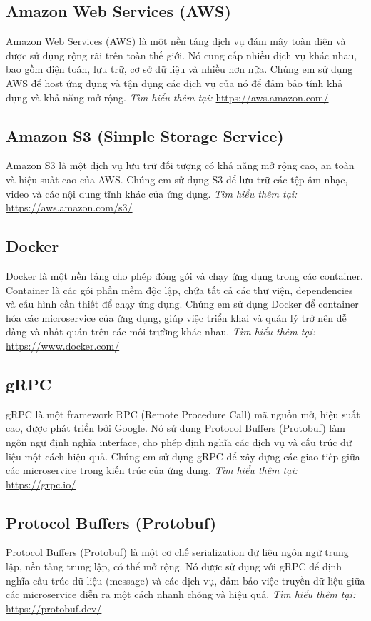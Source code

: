 \subsection{Amazon Web Services (AWS)}
Amazon Web Services (AWS) là một nền tảng dịch vụ đám mây toàn diện và được sử dụng rộng rãi trên toàn thế giới. Nó cung cấp nhiều dịch vụ khác nhau, bao gồm điện toán, lưu trữ, cơ sở dữ liệu và nhiều hơn nữa. Chúng em sử dụng AWS để host ứng dụng và tận dụng các dịch vụ của nó để đảm bảo tính khả dụng và khả năng mở rộng.
\textit{Tìm hiểu thêm tại:} \url{https://aws.amazon.com/}

\subsection{Amazon S3 (Simple Storage Service)}
Amazon S3 là một dịch vụ lưu trữ đối tượng có khả năng mở rộng cao, an toàn và hiệu suất cao của AWS. Chúng em sử dụng S3 để lưu trữ các tệp âm nhạc, video và các nội dung tĩnh khác của ứng dụng.
\textit{Tìm hiểu thêm tại:} \url{https://aws.amazon.com/s3/}

\subsection{Docker}
Docker là một nền tảng cho phép đóng gói và chạy ứng dụng trong các container. Container là các gói phần mềm độc lập, chứa tất cả các thư viện, dependencies và cấu hình cần thiết để chạy ứng dụng. Chúng em sử dụng Docker để container hóa các microservice của ứng dụng, giúp việc triển khai và quản lý trở nên dễ dàng và nhất quán trên các môi trường khác nhau.
\textit{Tìm hiểu thêm tại:} \url{https://www.docker.com/}

\subsection{gRPC}
gRPC là một framework RPC (Remote Procedure Call) mã nguồn mở, hiệu suất cao, được phát triển bởi Google. Nó sử dụng Protocol Buffers (Protobuf) làm ngôn ngữ định nghĩa interface, cho phép định nghĩa các dịch vụ và cấu trúc dữ liệu một cách hiệu quả. Chúng em sử dụng gRPC để xây dựng các giao tiếp giữa các microservice trong kiến trúc của ứng dụng.
\textit{Tìm hiểu thêm tại:} \url{https://grpc.io/}

\subsection{Protocol Buffers (Protobuf)}
Protocol Buffers (Protobuf) là một cơ chế serialization dữ liệu ngôn ngữ trung lập, nền tảng trung lập, có thể mở rộng. Nó được sử dụng với gRPC để định nghĩa cấu trúc dữ liệu (message) và các dịch vụ, đảm bảo việc truyền dữ liệu giữa các microservice diễn ra một cách nhanh chóng và hiệu quả.
\textit{Tìm hiểu thêm tại:} \url{https://protobuf.dev/}

